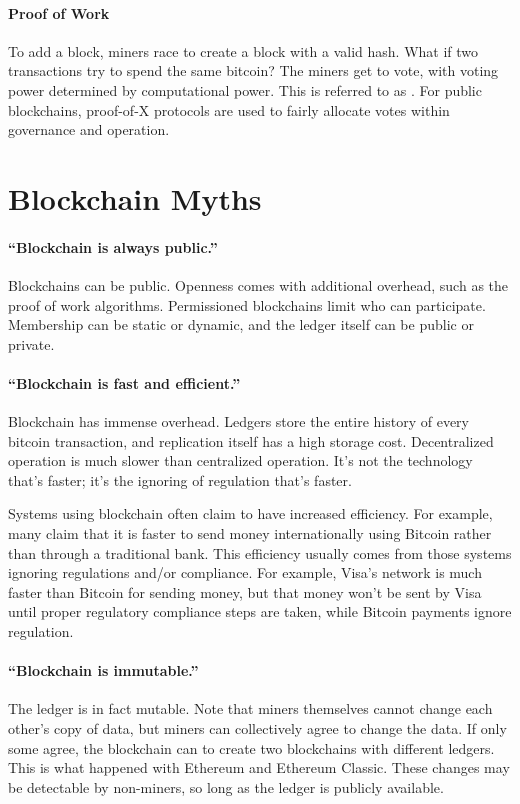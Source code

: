 \paragraph{Proof of Work} To add a block, miners race to create a block with a valid hash. What if two transactions try to spend the same bitcoin? The miners get to vote, with voting power determined by computational power. This is referred to as . For public blockchains, proof-of-X protocols are used to fairly allocate votes within governance and operation. 

\section{Blockchain Myths}

\paragraph{``Blockchain is always public.''} Blockchains can be public. Openness comes with additional overhead, such as the proof of work algorithms. Permissioned blockchains limit who can participate. Membership can be static or dynamic, and the ledger itself can be public or private.

\paragraph{``Blockchain is fast and efficient.''} Blockchain has immense overhead. Ledgers store the entire history of every bitcoin transaction, and replication itself has a high storage cost. Decentralized operation is much slower than centralized operation. It's not the technology that's faster; it's the ignoring of regulation that's faster.

Systems using blockchain often claim to have increased efficiency. For example, many claim that it is faster to send money internationally using Bitcoin rather than through a traditional bank. This efficiency usually comes from those systems ignoring regulations and/or compliance. For example, Visa's network is much faster than Bitcoin for sending money, but that money won't be sent by Visa until proper regulatory compliance steps are taken, while Bitcoin payments ignore regulation.

\paragraph{``Blockchain is immutable.''} The ledger is in fact mutable. Note that miners themselves cannot change each other's copy of data, but miners can collectively agree to change the data. If only some agree, the blockchain can  to create two blockchains with different ledgers. This is what happened with Ethereum and Ethereum Classic. These changes may be detectable by non-miners, so long as the ledger is publicly available.

